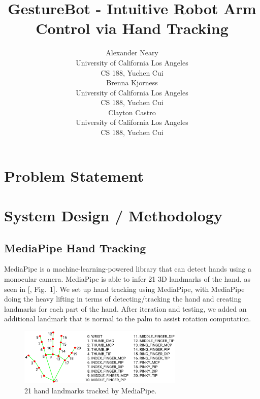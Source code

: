 \documentclass{article}
\title{GestureBot - Intuitive Robot Arm Control via Hand Tracking}
\author{
  Alexander Neary\\
  University of California Los Angeles \\
  CS 188, Yuchen Cui\\
  \And
  Brenna Kjorness\\
   University of California Los Angeles \\
  CS 188, Yuchen Cui\\
  \And
    Clayton Castro\\
     University of California Los Angeles \\
  CS 188, Yuchen Cui\\
}
\begin{document}
\maketitle




\section{Problem Statement}
	


\section{System Design / Methodology}
\label{sec:citations}



\subsection{MediaPipe Hand Tracking}
MediaPipe is a machine-learning-powered library that can detect hands using a monocular camera. MediaPipe is able to infer 21 3D landmarks of the hand, as seen in [\citealp{MediaPipeHands}, Fig.~1]. We set up hand tracking using MediaPipe\cite{MediaPipeGuide}, with MediaPipe doing the heavy lifting in terms of detecting/tracking the hand and creating landmarks for each part of the hand. After iteration and testing, we added an additional landmark that is normal to the palm to assist rotation computation. 

\begin{figure}[H]
  \centering
  \includegraphics[width=0.7\textwidth]{corl_2025_template/hand_landmarks.png}
  \caption{21 hand landmarks tracked by MediaPipe.}
  \label{fig:hand-landmarks}
\end{figure}
\end{document}
